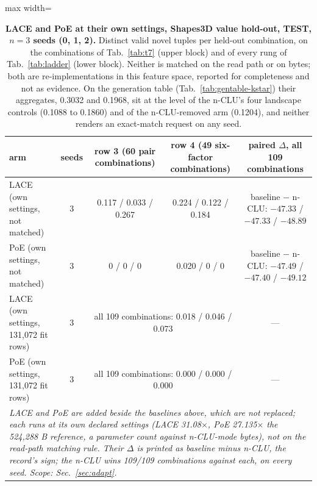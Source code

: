 \documentclass{article} %
\begin{document}
\begin{table}[h]
\centering\scriptsize
\caption{\textbf{LACE and PoE at their own settings, Shapes3D value hold-out, TEST, $n=3$ seeds (0, 1,
2).} Distinct valid novel tuples per held-out combination, on the combinations of Tab.~\ref{tab:t7} (upper block) and of
every rung of Tab.~\ref{tab:ladder} (lower block). Neither is matched on the read path or on bytes;
both are re-implementations in this feature space, reported for completeness and not as evidence. On
the generation table (Tab.~\ref{tab:gentable-kstar}) their aggregates, 0.3032 and 0.1968, sit at the %
level of the n-CLU's four landscape controls (0.1088 to 0.1860) and of the n-CLU-removed arm %
(0.1204), and neither renders an exact-match request on any seed.} %
\label{tab:lace-poe}
\setlength{\tabcolsep}{2.6pt}
\begin{adjustbox}{max width=\linewidth}\begin{tabular}{lcccc}
\toprule
arm & seeds & row 3 (60 pair combinations) & row 4 (49 six-factor combinations) & paired $\Delta$, all 109 combinations \\ %
\midrule
LACE (own settings, not matched) & 3 & 0.117 / 0.033 / 0.267 & 0.224 / 0.122 / 0.184 & baseline $-$ n-CLU: $-47.33$ / $-47.33$ / $-48.89$ \\
PoE (own settings, not matched) & 3 & 0 / 0 / 0 & 0.020 / 0 / 0 & baseline $-$ n-CLU: $-47.49$ / $-47.40$ / $-49.12$ \\
LACE (own settings, 131,072 fit rows) & 3 & \multicolumn{2}{c}{all 109 combinations: 0.018 / 0.046 / 0.073} & --- \\ %
PoE (own settings, 131,072 fit rows) & 3 & \multicolumn{2}{c}{all 109 combinations: 0.000 / 0.000 / 0.000} & --- \\ %
\multicolumn{5}{p{15cm}}{\emph{LACE and PoE are added beside the baselines above, which are not replaced; each runs at its own declared settings (LACE 31.08$\times$, PoE 27.135$\times$ the 524,288 B reference, a parameter count against n-CLU-mode bytes), not on the read-path matching rule. Their $\Delta$ is printed as baseline minus n-CLU, the record's sign; the n-CLU wins 109/109 combinations against each, on every seed. Scope: Sec.~\ref{sec:adapt}.}} \\ %
\bottomrule
\end{tabular}\end{adjustbox}


\end{table}
\end{document}
